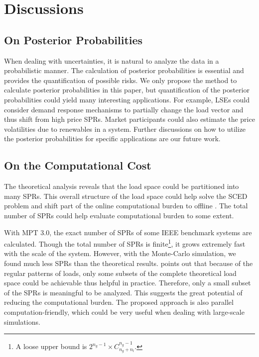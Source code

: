 \documentclass[letterpaper, 11pt]{article}
\theoremstyle{plain}
\theoremstyle{definition}
\begin{document}
\section{Discussions} \label{sec:discussions}

\subsection{On Posterior Probabilities} \label{sub:on_posterior_probabilities}
When dealing with uncertainties, it is natural to analyze the data in a probabilistic manner. The calculation of posterior probabilities is essential and provides the quantification of possible risks. We only propose the method to calculate posterior probabilities in this paper, but quantification of the posterior probabilities could yield many interesting applications. For example, LSEs could consider demand response mechanisms to partially change the load vector and thus shift from high price SPRs. Market participants could also estimate the price volatilities due to renewables in a system. Further discussions on how to utilize the posterior probabilities for specific applications are our future work.



\subsection{On the Computational Cost} \label{sub:data_requirement_of_the_data_driven_approach}

The theoretical analysis reveals that the load space could be partitioned into many SPRs. This overall structure of the load space could help solve the SCED problem and shift part of the online computational burden to offline \cite{Jia}. The total number of SPRs could help evaluate computational burden to some extent.


With MPT 3.0, the exact number of SPRs of some IEEE benchmark systems are calculated. Though the total number of SPRs is finite\footnote{A loose upper bound is $2^{n_g-1}\times C_{n_g+n_l}^{n_g-1}$.}, it grows extremely fast with the scale of the system. However, with the Monte-Carlo simulation, we found much less SPRs than the theoretical results. \cite{Zhou2011} points out that because of the regular patterns of loads, only some subsets of the complete theoretical load space could be achievable thus helpful in practice. Therefore, only a small subset of the SPRs is meaningful to be analyzed. This suggests the great potential of reducing the computational burden.
The proposed approach is also parallel computation-friendly, which could be very useful when dealing with large-scale simulations.
\end{document}
